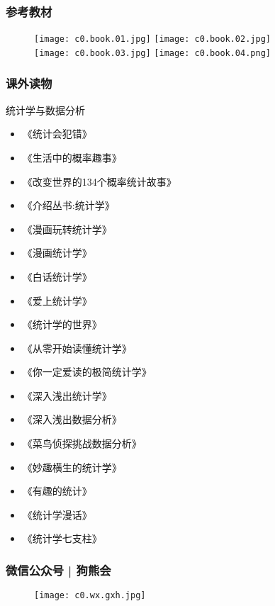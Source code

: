 \begin{frame}
  \frametitle{参考教材}
  \begin{figure}
    \centering
    \texttt{[image: c0.book.01.jpg]}\qquad
    \texttt{[image: c0.book.02.jpg]}\\
    \texttt{[image: c0.book.03.jpg]}\qquad
    \texttt{[image: c0.book.04.png]}
  \end{figure}
\end{frame}

\begin{frame}
  \frametitle{课外读物}
    \begin{block}{统计学与数据分析}
      \begin{multicols}{2}
      \begin{itemize}
         \item 《统计会犯错》
         \item 《生活中的概率趣事》
         \item 《改变世界的134个概率统计故事》
         \item 《介绍丛书:统计学》
         \item 《漫画玩转统计学》
         \item 《漫画统计学》
         \item 《白话统计学》
         \item 《爱上统计学》
         \item 《统计学的世界》
         \item 《从零开始读懂统计学》
         \item 《你一定爱读的极简统计学》
         \item 《深入浅出统计学》
         \item 《深入浅出数据分析》
         \item 《菜鸟侦探挑战数据分析》
         \item 《妙趣横生的统计学》
         \item 《有趣的统计》
         \item 《统计学漫话》
         \item 《统计学七支柱》
        \end{itemize}
      \end{multicols}
    \end{block}
\end{frame}

\begin{frame}
  \frametitle{微信公众号 | 狗熊会}
  \begin{figure}
    \centering
    \texttt{[image: c0.wx.gxh.jpg]}
  \end{figure}
\end{frame}

